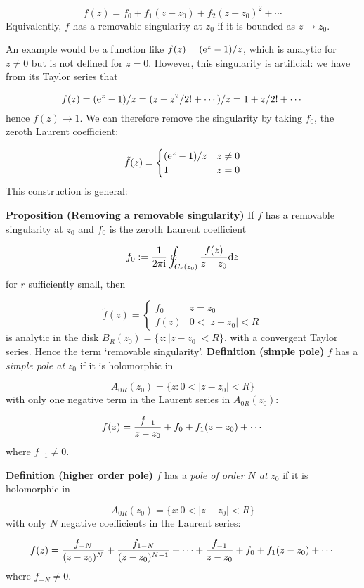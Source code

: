 \documentclass[12pt,landscape]{article}
\def\D{ {\rm d} }
\def\I{ {\rm i} }
\def\E{ {\rm e} }
\begin{document}
{\[
f(z) = f_0 + f_1 (z-z_0) + f_2 (z-z_0)^2 + \cdots
\]
Equivalently, $f$ has a removable singularity at $z_0$ if it is bounded as $z \rightarrow z_0$.

An example would be a function like $f(z) = (\E^z - 1) / z$, which is analytic for $z \neq 0$ but is not defined for $z = 0$. However, this singularity is artificial: we have from its Taylor series that

\[
f(z) = (\E^{z} - 1)/z = (z + z^2 / 2! + \cdots)/z = 1 + z/2! + \cdots
\]
hence $f(z) \rightarrow 1$. We can therefore remove the singularity by taking $f_0$, the zeroth Laurent coefficient:

\[
\tilde f(z) = \begin{cases}
    (\E^z - 1)/ z & z \neq 0 \\
    1 & z = 0
    \end{cases}
\]
This construction is general:

\textbf{Proposition (Removing a removable singularity)} If  $f$ has a removable singularity at $z_0$ and $f_0$ is the zeroth Laurent coefficient

\[
    f_0 := {1 \over 2 \pi \I} \oint_{C_r(z_0)} {f(z) \over z-z_0} \D z
\]
for $r$ sufficiently small, then

\[
\tilde f(z) = \begin{cases} f_0 & z = z_0 \\
                                f(z) & 0 < |z-z_0| < R
                                \end{cases}
\]
is analytic in the disk $B_R(z_0) = \{ z : |z-z_0| < R \}$, with a convergent Taylor series. Hence the term `removable singularity'.
\newpage
\textbf{Definition (simple pole)} $f$ has a  \emph{simple pole at} $z_0$ if it is holomorphic in

\[
  A_{0R}(z_0) = \{z : 0 < |z - z_0| < R \}
\]
with only one negative term in the Laurent series in $A_{0R}(z_0)$:

\[
  f(z) = {f_{-1} \over z - z_0}  + f_0 + f_1 (z - z_0) + \cdots
\]
where $f_{-1} \neq 0$.

\textbf{Definition (higher order pole)} $f$ has a  \emph{pole of order $N$ at} ${z_0}$ if it is holomorphic in

\[
 A_{0R}(z_0) = \{z : 0 < |z - z_0| < R \}
\]
with only $N$ negative coefficients in the Laurent series:

\[
 f(z) = {f_{-N} \over (z - z_0)^N}  + {f_{1-N} \over (z - z_0)^{N-1}} +  \cdots + {f_{-1} \over z-z_0} + f_0 + f_1 (z-z_0) + \cdots
\]
where $f_{-N} \neq 0$.

}
\end{document}
